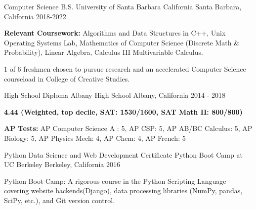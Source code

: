 
\begin{cventries}

  \cventry
    {Computer Science B.S.} %
    {University of Santa Barbara California} %
    {Santa Barbara, California} %
    {2018-2022} %
    {
    \begin{cvitems}
    \item \textbf{Relevant Coursework:} Algorithms and Data Structures in C++, Unix Operating Systems Lab, Mathematics of Computer Science (Discrete Math \& Probability), Linear Algebra, Calculus III Multivariable Calculus.
    \item 1 of 6 freshmen chosen to pursue research and an accelerated Computer Science courseload in College of Creative Studies.
    \end{cvitems}
    }

  \cventry
    {High School Diploma} %
    {Albany High School} %
    {Albany, California} %
    {2014 - 2018} %
    {
    \begin{cvitems}
    \item \textbf{4.44 (Weighted, top decile, SAT: 1530/1600, SAT Math II: 800/800)}
    \item \textbf{AP Tests:} AP Computer Science A : 5, AP CSP: 5, AP AB/BC Calculus: 5, AP Biology: 5, AP Physics Mech: 4, AP Chem: 4, AP French: 5
    \end{cvitems}
    }

 \cventry
    {Python Data Science and Web Development Certificate} %
    {Python Boot Camp at UC Berkeley} %
    {Berkeley, California} %
    {2016} %
    {
      \begin{cvitems}
      \item Python Boot Camp: A rigorous course in the Python Scripting Language covering website backends(Django), data processing libraries (NumPy, pandas, SciPy, etc.), and Git version control.
      \end{cvitems}
      }


\end{cventries}
